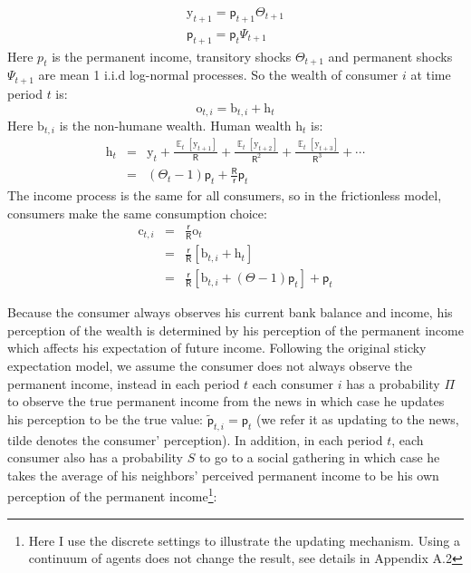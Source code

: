 \documentclass[12pt,letterpaper]{article}
\DeclareMathOperator{\E}{\mathbb{E}}
\begin{document}
\begin{eqnarray} \label{Toy:Income}
\mathrm{y}_{t+1}=\mathsf{p}_{t+1}\Theta_{t+1}\\
\mathsf{p}_{t+1}=\mathsf{p}_{t}\Psi_{t+1}
\end{eqnarray}
Here $p_{t}$ is the permanent income, transitory shocks $\Theta_{t+1}$ and permanent shocks $\Psi_{t+1}$ are mean 1 i.i.d log-normal processes. So the wealth of consumer $i$ at time period $t$ is:
\begin{equation}
\mathrm{o}_{t,i}=\mathrm{b}_{t,i}+\mathrm{h}_{t}
\end{equation}
Here $\mathrm{b}_{t,i}$ is the non-humane wealth. Human wealth $\mathrm{h}_{t}$ is:
\begin{eqnarray}
\mathrm{h}_{t} & = & \mathrm{y}_{t}+\frac{\E_{t}[\mathrm{y}_{t+1}]}{\mathsf{R}}+\frac{\E_{t}[\mathrm{y}_{t+2}]}{\mathsf{R}^2}+\frac{\E_{t}[\mathrm{y}_{t+3}]}{\mathsf{R}^3}+\cdots\\
& = & (\Theta_{t}-1)\mathsf{p}_{t}+\frac{\mathsf{R}}{\mathsf{r}}\mathsf{p}_{t} \nonumber
\end{eqnarray}
The income process is the same for all consumers, so in the frictionless model, consumers make the same consumption choice:
\begin{eqnarray}
\mathrm{c}_{t,i} & = & \frac{\mathsf{r}}{\mathsf{R}}\mathrm{o}_{t}\\
& = & \frac{\mathsf{r}}{\mathsf{R}}\left[\mathrm{b}_{t,i}+\mathrm{h}_{t}\right]\\ \nonumber
& = & \frac{\mathsf{r}}{\mathsf{R}}\left[\mathrm{b}_{t,i}+(\Theta-1)\mathsf{p}_{t}\right]+\mathsf{p}_{t} \nonumber
\end{eqnarray}
\par
Because the consumer always observes his current bank balance and income, his perception of the wealth is determined by his perception of the permanent income which affects his expectation of future income. Following the original sticky expectation model, we assume the consumer does not always observe the permanent income, instead in each period $t$ each consumer $i$ has a probability $\Pi$ to observe the true permanent income from the news in which case he updates his perception to be the true value: $\tilde{\mathsf{p}}_{t,i}=\mathsf{p}_{t}$ (we refer it as updating to the news, tilde denotes the consumer' perception). In addition, in each period $t$, each consumer also has a probability $S$ to go to a social gathering in which case he takes the average of his neighbors' perceived permanent income to be his own perception of the permanent income\footnote{Here I use the discrete settings to illustrate the updating mechanism. Using a continuum of agents does not change the result,  see details in Appendix A.2}:
\end{document}
